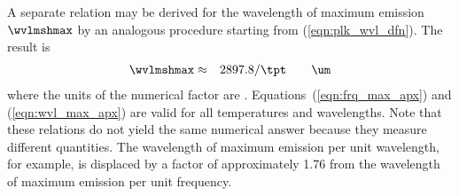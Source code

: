 \documentclass[12pt]{article}
\begin{document}
A separate relation may be derived for the wavelength of maximum
emission $\wvlmshmax$ by an analogous procedure starting from
(\ref{eqn:plk_wvl_dfn}). 
The result is
\begin{eqnarray}
\wvlmshmax & \approx & 2897.8 / \tpt \qquad\mbox{\um}
\label{eqn:wvl_max_apx}
\end{eqnarray}
where the units of the numerical factor are \umk.
Equations~(\ref{eqn:frq_max_apx}) and (\ref{eqn:wvl_max_apx}) are valid for all temperatures and wavelengths.
Note that these relations do not yield the same numerical answer because they measure different quantities.
The wavelength of maximum emission per unit wavelength, for example,
is displaced by a factor of approximately 1.76 from the wavelength of
maximum emission per unit frequency.
\end{document}
